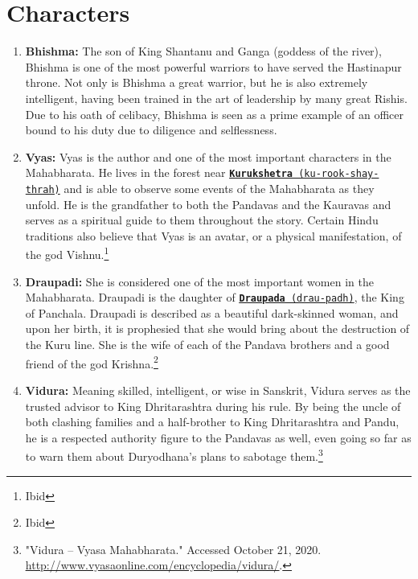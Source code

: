 \documentclass[10pt, letterpaper]{article}
\begin{document}
\newpage
\section{Characters}

\begin{enumerate}

\item
  
  \textbf{Bhishma:} The son of King Shantanu and Ganga (goddess of the
  river), Bhishma is one of the most powerful warriors to have served
  the Hastinapur throne. Not only is Bhishma a great warrior, but he is
  also extremely intelligent, having been trained in the art of
  leadership by many great Rishis. Due to his oath of celibacy, Bhishma
  is seen as a prime example of an officer bound to his duty due to
  diligence and selflessness.
  
\item
  
  \textbf{Vyas:} Vyas is the author and one of the most important
  characters in the Mahabharata. He lives in the forest near
  \texttt{\underline{\href{https://drive.google.com/file/d/1ctcl-Kifl3_FC-85r-w0dtUBqPwg7l3s/view?usp=sharing}{\textbf{Kurukshetra}}
  (ku-rook-shay-thrah)}} and is able to observe some events of the
  Mahabharata as they unfold. He is the grandfather to both the Pandavas
  and the Kauravas and serves as a spiritual guide to them throughout
  the story. Certain Hindu traditions also believe that Vyas is an
  avatar, or a physical manifestation, of the god Vishnu.\footnote{Ibid}
  
\item
  
  \textbf{Draupadi:} She is considered one of the most important women
  in the Mahabharata. Draupadi is the daughter of
  \texttt{\underline{\href{https://drive.google.com/file/d/1DRSKdG2iXMycN3Y0mPwXKNU_s1o2KvcY/view?usp=sharing}{\textbf{Draupada}}
  (drau-padh)}}, the King of Panchala. Draupadi is described as a
  beautiful dark-skinned woman, and upon her birth, it is prophesied
  that she would bring about the destruction of the Kuru line. She is
  the wife of each of the Pandava brothers and a good friend of the god
  Krishna.\footnote{Ibid}
  
\item
  
  \textbf{Vidura:} Meaning skilled, intelligent, or wise in Sanskrit,
  Vidura serves as the trusted advisor to King Dhritarashtra during his
  rule. By being the uncle of both clashing families and a half-brother
  to King Dhritarashtra and Pandu, he is a respected authority figure to
  the Pandavas as well, even going so far as to warn them about
  Duryodhana's plans to sabotage them.\footnote{"Vidura -- Vyasa
    Mahabharata." Accessed October 21, 2020.
    \href{http://www.vyasaonline.com/encyclopedia/vidura/}{\underline{http://www.vyasaonline.com/encyclopedia/vidura/}}.}
  

\end{enumerate}
\end{document}
